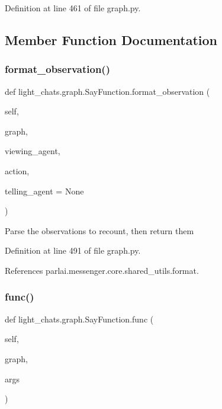 Definition at line 461 of file graph.\+py.



\subsection{Member Function Documentation}
\mbox{\label{classlight__chats_1_1graph_1_1SayFunction_a20e5908183144f719a93276707938894}} 
\subsubsection{\texorpdfstring{format\+\_\+observation()}{format\_observation()}}
{\footnotesize\ttfamily def light\+\_\+chats.\+graph.\+Say\+Function.\+format\+\_\+observation (\begin{DoxyParamCaption}\item[{}]{self,  }\item[{}]{graph,  }\item[{}]{viewing\+\_\+agent,  }\item[{}]{action,  }\item[{}]{telling\+\_\+agent = {\ttfamily None} }\end{DoxyParamCaption})}

\begin{DoxyVerb}Parse the observations to recount, then return them\end{DoxyVerb}
 

Definition at line 491 of file graph.\+py.



References parlai.\+messenger.\+core.\+shared\+\_\+utils.\+format.

\mbox{\label{classlight__chats_1_1graph_1_1SayFunction_af14fb1e5a036d9c537ea2915f2c76275}} 
\subsubsection{\texorpdfstring{func()}{func()}}
{\footnotesize\ttfamily def light\+\_\+chats.\+graph.\+Say\+Function.\+func (\begin{DoxyParamCaption}\item[{}]{self,  }\item[{}]{graph,  }\item[{}]{args }\end{DoxyParamCaption})}

